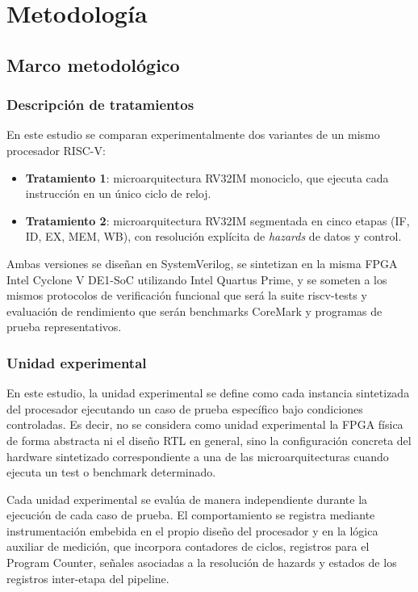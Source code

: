 \section{Metodología}
\label{sec:metodologia}

\subsection{Marco metodológico}

\subsubsection{Descripción de tratamientos}

En este estudio se comparan experimentalmente dos variantes de un mismo procesador RISC-V:

\begin{itemize}
    \item \textbf{Tratamiento 1}: microarquitectura RV32IM monociclo, que ejecuta cada instrucción en un único ciclo de reloj.
    \item \textbf{Tratamiento 2}: microarquitectura RV32IM segmentada en cinco etapas (IF, ID, EX, MEM, WB), con resolución explícita de \textit{hazards} de datos y control.
\end{itemize}

Ambas versiones se diseñan en SystemVerilog, se sintetizan en la misma FPGA Intel Cyclone V DE1-SoC utilizando Intel Quartus Prime, y se someten a los mismos protocolos de verificación funcional que será la suite riscv-tests y evaluación de rendimiento que serán benchmarks CoreMark y programas de prueba representativos.


\subsubsection{Unidad experimental}
En este estudio, la unidad experimental se define como cada instancia sintetizada del procesador ejecutando un caso de prueba específico bajo condiciones controladas. Es decir, no se considera como unidad experimental la FPGA física de forma abstracta ni el diseño RTL en general, sino la configuración concreta del hardware sintetizado correspondiente a una de las microarquitecturas cuando ejecuta un test o benchmark determinado.

Cada unidad experimental se evalúa de manera independiente durante la ejecución de cada caso de prueba. El comportamiento se registra mediante instrumentación embebida en el propio diseño del procesador y en la lógica auxiliar de medición, que incorpora contadores de ciclos, registros para el Program Counter, señales asociadas a la resolución de hazards y estados de los registros inter-etapa del pipeline.

